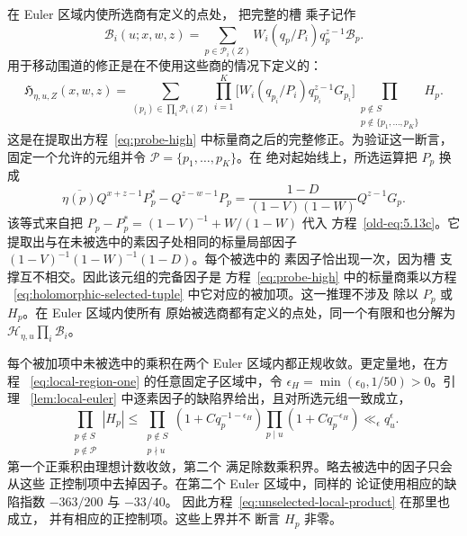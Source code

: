 在 Euler 区域内使所选商有定义的点处，
把完整的槽
乘子记作
\[
 \mathcal B_i(u;x,w,z)=\sum_{p\in\mathcal P_i(Z)}
           W_i(q_p/P_i)q_p^{z-1}\mathcal B_p.
\]
用于移动围道的修正是在不使用这些商的情况下定义的：
\begin{equation}\label{eq:holomorphic-selected-tuple}
 \mathfrak H_{\eta,u,Z}(x,w,z)=
 \sum_{(p_i)\in\prod_i\mathcal P_i(Z)}
 \prod_{i=1}^K\bigl[W_i(q_{p_i}/P_i)q_{p_i}^{z-1}G_{p_i}\bigr]
 \prod_{\substack{p\notin S\\p\notin\{p_1,\ldots,p_K\}}}H_p.
\end{equation}
这是在提取出方程~\eqref{eq:probe-high} 中标量商之后的完整修正。为验证这一断言，
固定一个允许的元组并令 $\mathcal P=\{p_1,\ldots,p_K\}$。在
绝对起始线上，所选运算把 $P_p$ 换成
\begin{equation}\label{eq:selected-local-operation}
 \overline{\eta(p)}Q^{x+z-1}P_p^*-Q^{z-w-1}P_p
 =\frac{1-D}{(1-V)(1-W)}Q^{z-1}G_p.
\end{equation}
该等式来自把
$P_p-P_p^*=(1-V)^{-1}+W/(1-W)$ 代入
方程~\eqref{old-eq:5.13c}。它提取出与在未被选中的素因子处相同的标量局部因子
$(1-V)^{-1}(1-W)^{-1}(1-D)$。每个被选中的
素因子恰出现一次，因为槽
支撑互不相交。因此该元组的完备因子是
方程~\eqref{eq:probe-high} 中的标量商乘以方程
~\eqref{eq:holomorphic-selected-tuple} 中它对应的被加项。这一推理不涉及
除以 $P_p$ 或 $H_p$。在 Euler 区域内使所有
原始被选商都有定义的点处，同一个有限和也分解为
$\mathcal H_{\eta,u}\prod_i\mathcal B_i$。

每个被加项中未被选中的乘积在两个 Euler
区域内都正规收敛。更定量地，在方程
~\eqref{eq:local-region-one} 的任意固定子区域中，令
$\epsilon_H=\min(\epsilon_0,1/50)>0$。引理
~\ref{lem:local-euler} 中逐素因子的缺陷界给出，且对所选元组一致成立，
\begin{equation}\label{eq:unselected-local-product}
 \prod_{\substack{p\notin S\\p\notin\mathcal P}}|H_p|
 \le
 \prod_{\substack{p\notin S\\p\nmid u}}
       (1+Cq_p^{-1-\epsilon_H})
 \prod_{p\mid u}(1+Cq_p^{-\epsilon_H})
 \ll_\epsilon q_u^\epsilon.
\end{equation}
第一个正乘积由理想计数收敛，第二个
满足除数乘积界。略去被选中的因子只会从这些
正控制项中去掉因子。在第二个 Euler 区域中，同样的
论证使用相应的缺陷指数 $-363/200$ 与 $-33/40$。
因此方程~\eqref{eq:unselected-local-product} 在那里也成立，
并有相应的正控制项。这些上界并不
断言 $H_p$ 非零。


